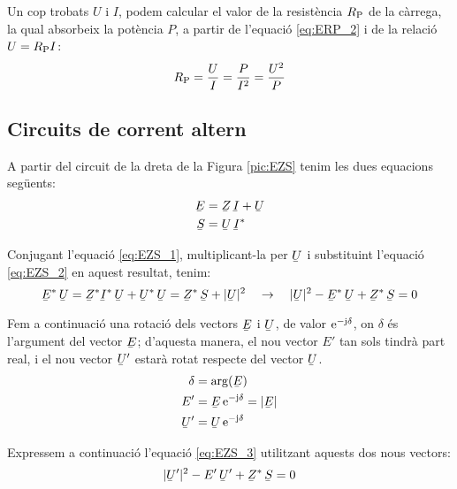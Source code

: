 Un cop trobats $U$ i $I$, podem calcular el valor de la resist\`{e}ncia
$R_\mathrm{P}$ de la c\`{a}rrega, la qual absorbeix la pot\`{e}ncia $P$, a
partir de l'equaci\'{o} \eqref{eq:ERP_2} i de la relaci\'{o} $U =R_\mathrm{P}
I$:
\begin{equation}
   R_\mathrm{P} = \frac{U}{I} = \frac{P}{I^2} = \frac{U^2}{P}
\end{equation}

\subsection{Circuits de corrent altern}

A partir del circuit de la dreta de la Figura \vref{pic:EZS} tenim les dues equacions seg\"{u}ents:
\begin{align}
   \cmplx{E} &= \cmplx{Z} \, \cmplx{I} + \cmplx{U} \label{eq:EZS_1} \\
   \cmplx{S} &= \cmplx{U} \, \cmplx{I}^*           \label{eq:EZS_2}
\end{align}

Conjugant l'equaci\'{o} \eqref{eq:EZS_1}, multiplicant-la per $\cmplx{U}$ i substituint l'equaci\'{o} \eqref{eq:EZS_2} en aquest resultat, tenim:
\begin{equation}
   \cmplx{E}^* \, \cmplx{U} = \cmplx{Z}^* \cmplx{I}^* \, \cmplx{U} + \cmplx{U}^* \, \cmplx{U} =
   \cmplx{Z}^* \, \cmplx{S} + |\cmplx{U}|^2 \quad \rightarrow \quad
   |\cmplx{U}|^2 - \cmplx{E}^* \, \cmplx{U} + \cmplx{Z}^* \, \cmplx{S} = 0
   \label{eq:EZS_3}
\end{equation}

Fem a continuaci\'{o} una rotaci\'{o} dels vectors $\cmplx{E}$ i
$\cmplx{U}$, de valor $\mathrm{e}^{-\mathrm{j}\delta}$, on $\delta$ \'{e}s l'argument
del vector $\cmplx{E}$; d'aquesta manera, el nou vector $E'$ tan
sols tindr\`{a} part real, i el nou vector $\cmplx{U}'$ estar\`{a} rotat
respecte del vector $\cmplx{U}$.
\begin{align}
   \delta &= \arg(\cmplx{E}) \label{eq:EZS_9} \\
   E' &= \cmplx{E} \, \eu^{-\ju\delta} = |\cmplx{E}|  \label{eq:EZS_4} \\
   \cmplx{U}' &= \cmplx{U} \, \eu^{-\ju\delta}   \label{eq:EZS_5}
\end{align}

Expressem a continuaci\'{o} l'equaci\'{o} \eqref{eq:EZS_3} utilitzant
aquests dos nous vectors:
\begin{equation}
   |\cmplx{U}'|^2 - E' \, \cmplx{U}' + \cmplx{Z}^* \, \cmplx{S} = 0 \label{eq:EZS_6}
\end{equation}

